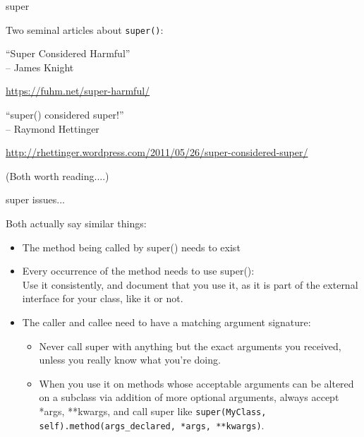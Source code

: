 \documentclass{beamer}
\begin{document}
\begin{frame}[fragile]{super}

{\Large Two seminal articles about \verb|super()|:}

\vfill
{\LARGE ``Super Considered Harmful''}\\[0.1in]
{\Large \hspace{0.5in}-- James Knight }

\vfill
\url{https://fuhm.net/super-harmful/}


\vfill
{\LARGE ``super() considered super!''}\\[0.1in]
{\Large  \hspace{0.5in}--  Raymond Hettinger }

\vfill
\url{http://rhettinger.wordpress.com/2011/05/26/super-considered-super/}
\vfill

{\large (Both worth reading....)}
\end{frame} 

\begin{frame}[fragile]{super issues...}

{\Large Both actually say similar things:}

\begin{itemize}
  \item The method being called by super() needs to exist
  \item Every occurrence of the method needs to use super():\\
        Use it consistently, and document that you use it, as it is part of the external interface for your class, like it or not.
  \item The caller and callee need to have a matching argument signature:
  \begin{itemize}
     \item Never call super with anything but the exact arguments you received, unless you really know what you're doing.
     \item When you use it on methods whose acceptable arguments can be altered on a subclass via addition of more optional arguments, always accept *args, **kwargs, and call super like \verb|super(MyClass, self).method(args_declared, *args, **kwargs)|.
  \end{itemize}

\end{itemize}

\end{frame} 

\end{document}

